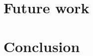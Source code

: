 \documentclass{article}
\begin{document}
\section{Future work}
\label{sec:future-work}



\section{Conclusion}




\end{document}
